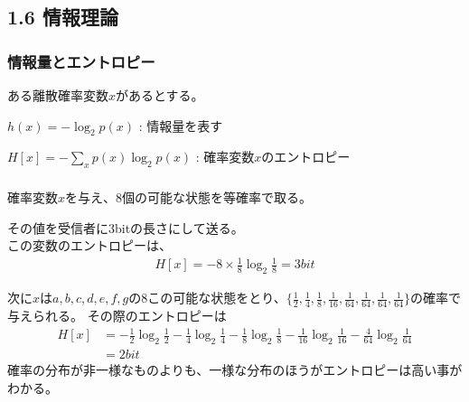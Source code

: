 \documentclass[dvipdfmx]{beamer}
\theoremstyle{definition}
\begin{document}
\subsection{1.6 情報理論}
\begin{frame}
  \frametitle{情報量とエントロピー}
  ある離散確率変数$x$があるとする。

  $h(x) = -\log_{2}p(x)$ : 情報量を表す
  
  $H[x] = - \sum_{x} p(x)\log_{2}p(x)$ : 確率変数$x$のエントロピー
\end{frame}

\begin{frame}
  \frametitle{}
  確率変数$x$を与え、8個の可能な状態を等確率で取る。
  
  その値を受信者に3bitの長さにして送る。\\この変数のエントロピーは、
  \begin{gather*}
    H[x] = -8 \times \frac{1}{8}\log_{2}\frac{1}{8}=3bit
  \end{gather*}

  次に$x$は${a,b,c,d,e,f,g}$の8この可能な状態をとり、$\{\frac{1}{2},\frac{1}{4},\frac{1}{8},\frac{1}{16},\frac{1}{64},\frac{1}{64},\frac{1}{64},\frac{1}{64} \}$の確率で与えられる。
  その際のエントロピーは
  \begin{align*}
    H[x] &= -\frac{1}{2} \log_{2} \frac{1}{2} -\frac{1}{4}\log_{2}\frac{1}{4} -\frac{1}{8}\log_{2}\frac{1}{8} -\frac{1}{16}\log_{2}\frac{1}{16} -\frac{4}{64}\log_{2}\frac{1}{64} \\
         &= 2bit
  \end{align*}
  確率の分布が非一様なものよりも、一様な分布のほうがエントロピーは高い事がわかる。
\end{frame}

\begin{frame}
  \frametitle{}
\end{frame}

\begin{frame}
  \frametitle{}
\end{frame}

\begin{frame}
  \frametitle{}
\end{frame}

\begin{frame}
  \frametitle{}
\end{frame}

\begin{frame}
  \frametitle{}
\end{frame}

\begin{frame}
  \frametitle{}
\end{frame}

\begin{frame}
  \frametitle{}
\end{frame}

\begin{frame}
  \frametitle{}
\end{frame}
\end{document}
